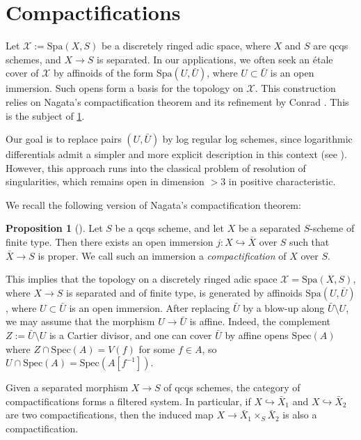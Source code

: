 \documentclass{amsart}
\def\Spa{\textrm{Spa}}
\def\Spec{\textrm{Spec}}
\theoremstyle{definition}
\newtheorem{proposition}[theorem]{Proposition}
\numberwithin{equation}{section}
\begin{document}
\appendix
\section{Compactifications}\label{sec:Compactifications}
Let $\mathcal{X} := \Spa(X, S)$ be a discretely ringed adic space, where $X$ and $S$ are qcqs schemes, and $X \to S$ is separated. In our applications, we often seek an étale cover of $\mathcal{X}$ by affinoids of the form $\Spa(U, \bar{U})$, where $U \subset \bar{U}$ is an open immersion. Such opens form a basis for the topology on $\mathcal{X}$. This construction relies on Nagata's compactification theorem and its refinement by Conrad \cite{Conrad}. This is the subject of \cref{sec:Compactifications}.

Our goal is to replace pairs $(U, \bar{U})$ by log regular log schemes, since logarithmic differentials admit a simpler and more explicit description in this context (see \cite{LogDiff}). However, this approach runs into the classical problem of resolution of singularities, which remains open in dimension $>3$ in positive characteristic.


We recall the following version of Nagata's compactification theorem:

\begin{proposition}[{\cite[Theorem 4.3.]{Conrad}}]\label{NagataCompactification}
	Let $S$ be a qcqs scheme, and let $X$ be a separated $S$-scheme of finite type. Then there exists an open immersion $j: X \hookrightarrow \bar{X}$ over $S$ such that $\bar{X} \to S$ is proper. We call such an immersion a \emph{compactification} of $X$ over $S$.
\end{proposition}

This implies that the topology on a discretely ringed adic space $\mathcal{X} = \Spa(X, S)$, where $X \to S$ is separated and of finite type, is generated by affinoids $\Spa(U, \bar{U})$, where $U \subset \bar{U}$ is an open immersion. After replacing $\bar{U}$ by a blow-up along $\bar{U} \setminus U$, we may assume that the morphism $U \to \bar{U}$ is affine. Indeed, the complement $Z := \bar{U} \setminus U$ is a Cartier divisor, and one can cover $\bar{U}$ by affine opens $\Spec(A)$ where $Z \cap \Spec(A) = V(f)$ for some $f \in A$, so $U \cap \Spec(A) = \Spec(A[f^{-1}])$.

Given a separated morphism $X \to S$ of qcqs schemes, the category of compactifications forms a filtered system. In particular, if $X \hookrightarrow \bar{X}_1$ and $X \hookrightarrow \bar{X}_2$ are two compactifications, then the induced map $X \to \bar{X}_1 \times_S \bar{X}_2$ is also a compactification.
\end{document}
